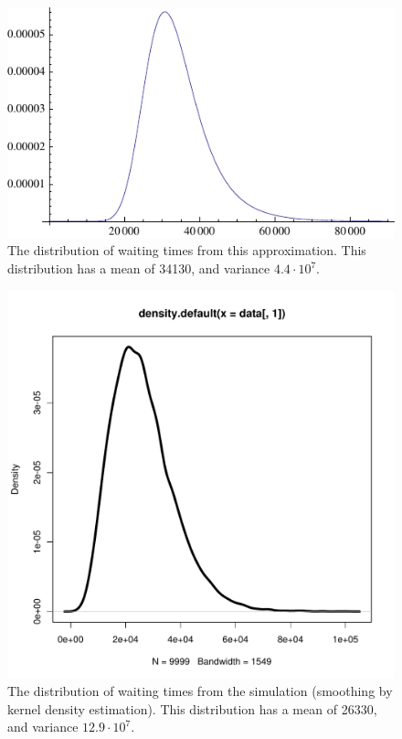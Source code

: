 \documentclass[letterpaper,10pt]{article}
\begin{document}
\begin{figure}
\begin{center}
\includegraphics[width=.9\textwidth]{images/mywaiting}
\caption{The distribution of waiting times from this approximation.  This distribution has a mean of 34130, and variance $4.4\cdot 10^7$.}
\end{center}
\end{figure}

\begin{figure}
\begin{center}
\includegraphics[width=.9\textwidth]{images/waittimes}
\caption{The distribution of waiting times from the simulation (smoothing by kernel density estimation).   This distribution has a mean of 26330, and variance $12.9\cdot 10^7$.}
\end{center}
\end{figure}
\end{document}
